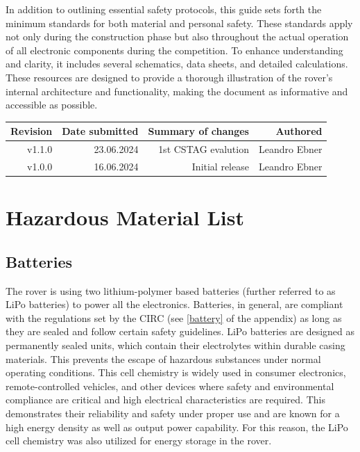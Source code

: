     \vspace{5mm} %

    In addition to outlining essential safety protocols, this guide sets forth the minimum standards for both material and personal safety. These standards apply not only during the construction phase but also throughout the actual operation of all electronic components during the competition. To enhance understanding and clarity, it includes several schematics, data sheets, and detailed calculations. These resources are designed to provide a thorough illustration of the rover's internal architecture and functionality, making the document as informative and accessible as possible.

    \begin{table}[b!] %
        \centering
        \begin{tabular}{|r|r|r|r|} \hline %
             Revision& Date submitted& Summary of changes&                   Authored      \\ \hline 
             v1.1.0&   23.06.2024&     1st CSTAG evalution&                  Leandro Ebner \\ \hline 
             v1.0.0&   16.06.2024&     Initial release&                      Leandro Ebner \\ \hline
        \end{tabular}
    \end{table}

    \clearpage %
    
\section{Hazardous Material List}

    \subsection{Batteries}
    
    The rover is using two lithium-polymer based batteries (further referred to as LiPo batteries) to power all the electronics. Batteries, in general, are compliant with the regulations set by the CIRC (see \ref{battery} of the appendix) as long as they are sealed and follow certain safety guidelines. LiPo batteries are designed as permanently sealed units, which contain their electrolytes within durable casing materials. This prevents the escape of hazardous substances under normal operating conditions. This cell chemistry is widely used in consumer electronics, remote-controlled vehicles, and other devices where safety and environmental compliance are critical and high electrical characteristics are required. This demonstrates their reliability and safety under proper use and are known for a high energy density as well as output power capability. For this reason, the LiPo cell chemistry was also utilized for energy storage in the rover.
    
